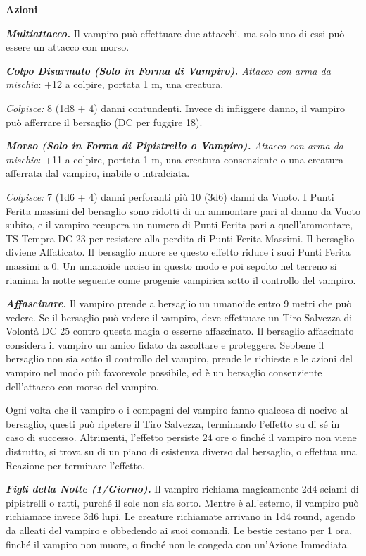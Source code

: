 \begin{multicols}{2}
{\textbf{Azioni}

\emph{\textbf{Multiattacco.}} Il vampiro può effettuare due attacchi, ma solo uno di essi può essere un attacco con morso.

\emph{\textbf{Colpo Disarmato (Solo in Forma di Vampiro).} Attacco con arma da mischia}: +12 a colpire, portata 1 m, una creatura.

\emph{Colpisce:} 8 (1d8 + 4) danni contundenti. Invece di infliggere danno, il vampiro può afferrare il bersaglio (DC per fuggire 18).

\emph{\textbf{Morso (Solo in Forma di Pipistrello o Vampiro).} Attacco con arma da mischia}: +11 a colpire, portata 1 m, una creatura consenziente o una creatura afferrata dal vampiro, inabile o intralciata.

\emph{Colpisce:} 7 (1d6 + 4) danni perforanti più 10 (3d6) danni da Vuoto. I Punti Ferita massimi del bersaglio sono ridotti di un ammontare pari al danno da Vuoto subito, e il vampiro recupera un numero di Punti Ferita pari a quell'ammontare, TS Tempra DC 23 per resistere alla perdita di Punti Ferita Massimi. Il bersaglio diviene Affaticato. Il bersaglio muore se questo effetto riduce i suoi Punti Ferita massimi a 0. Un umanoide ucciso in questo modo e poi sepolto nel terreno si rianima la notte seguente come progenie vampirica sotto il controllo del vampiro.

\emph{\textbf{Affascinare.}} Il vampiro prende a bersaglio un umanoide entro 9 metri che può vedere. Se il bersaglio può vedere il vampiro, deve effettuare un Tiro Salvezza di Volontà DC 25 contro questa magia o esserne affascinato. Il bersaglio affascinato considera il vampiro un amico fidato da ascoltare e proteggere. Sebbene il bersaglio non sia sotto il controllo del vampiro, prende le richieste e le azioni del vampiro nel modo più favorevole possibile, ed è un bersaglio consenziente dell'attacco con morso del vampiro.

Ogni volta che il vampiro o i compagni del vampiro fanno qualcosa di nocivo al bersaglio, questi può ripetere il Tiro Salvezza, terminando l'effetto su di sé in caso di successo. Altrimenti, l'effetto persiste 24 ore o finché il vampiro non viene distrutto, si trova su di un piano di esistenza diverso dal bersaglio, o effettua una Reazione per terminare l'effetto.

\emph{\textbf{Figli della Notte (1/Giorno).}} Il vampiro richiama magicamente 2d4 sciami di pipistrelli o ratti, purché il sole non sia sorto. Mentre è all'esterno, il vampiro può richiamare invece 3d6 lupi. Le creature richiamate arrivano in 1d4 round, agendo da alleati del vampiro e obbedendo ai suoi comandi. Le bestie restano per 1 ora, finché il vampiro non muore, o finché non le congeda con un'Azione Immediata.

}
\end{multicols}
